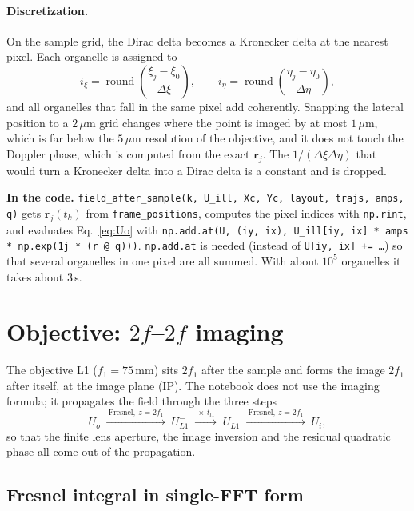 \documentclass[11pt,a4paper]{article}
\newcommand{\vr}{\mathbf{r}}
\newcommand{\um}{\,\mu\mathrm{m}}
\newcommand{\mm}{\,\mathrm{mm}}
\newcommand{\code}[1]{\texttt{\small #1}}
\newcommand{\incode}[1]{\par\smallskip\noindent\colorbox{black!6}{\parbox{\dimexpr\linewidth-2\fboxsep}{\small\textbf{In the code.} #1}}\par\smallskip}
\begin{document}
\paragraph{Discretization.}
On the sample grid, the Dirac delta becomes a Kronecker delta at the nearest
pixel. Each organelle is assigned to
\begin{equation}
  i_\xi = \operatorname{round}\!\left(\frac{\xi_j - \xi_0}{\Delta\xi}\right),\qquad
  i_\eta = \operatorname{round}\!\left(\frac{\eta_j - \eta_0}{\Delta\eta}\right),
\end{equation}
and all organelles that fall in the same pixel add coherently. Snapping the
lateral position to a $2\um$ grid changes where the point is imaged by at
most $1\um$, which is far below the $5\um$ resolution of the objective, and it
does not touch the Doppler phase, which is computed from the exact $\vr_j$.
The $1/(\Delta\xi\Delta\eta)$ that would turn a Kronecker delta into a Dirac
delta is a constant and is dropped.

\incode{\code{field\_after\_sample(k, U\_ill, Xc, Yc, layout, trajs, amps, q)}
gets $\vr_j(t_k)$ from \code{frame\_positions}, computes the pixel indices
with \code{np.rint}, and evaluates Eq.~\eqref{eq:Uo} with
\code{np.add.at(U, (iy, ix), U\_ill[iy, ix] * amps * np.exp(1j * (r @ q)))}.
\code{np.add.at} is needed (instead of \code{U[iy, ix] += \dots}) so that
several organelles in one pixel are all summed. With about $10^5$ organelles
it takes about $3\,$s.}

\section{Objective: \texorpdfstring{$2f$--$2f$}{2f-2f} imaging}
\label{sec:objective}

The objective L1 ($f_1 = 75\mm$) sits $2f_1$ after the sample and forms the
image $2f_1$ after itself, at the image plane (IP). The notebook does not use
the imaging formula; it propagates the field through the three steps
\begin{equation}
  U_o \;\xrightarrow{\ \text{Fresnel},\ z = 2f_1\ }\; U_{L1}^- \;\xrightarrow{\ \times\,t_{l1}\ }\; U_{L1} \;\xrightarrow{\ \text{Fresnel},\ z = 2f_1\ }\; U_i ,
\end{equation}
so that the finite lens aperture, the image inversion and the residual
quadratic phase all come out of the propagation.

\subsection{Fresnel integral in single-FFT form}
\label{sec:fresnel}
\end{document}
